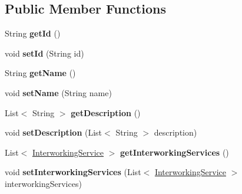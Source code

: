 \subsection*{Public Member Functions}
\begin{DoxyCompactItemize}
\item 
\mbox{\label{classeu_1_1h2020_1_1symbiote_1_1model_1_1mim_1_1System_a41604a076f13248f857928eaf1feb948}} 
String {\bfseries get\+Id} ()
\item 
\mbox{\label{classeu_1_1h2020_1_1symbiote_1_1model_1_1mim_1_1System_a82db0ed79ee0bf4d0c132a45501cba58}} 
void {\bfseries set\+Id} (String id)
\item 
\mbox{\label{classeu_1_1h2020_1_1symbiote_1_1model_1_1mim_1_1System_af329b8f6ab14475264da13b3db84d63b}} 
String {\bfseries get\+Name} ()
\item 
\mbox{\label{classeu_1_1h2020_1_1symbiote_1_1model_1_1mim_1_1System_a34d9e62c549cba8fe729e6bc5affa2be}} 
void {\bfseries set\+Name} (String name)
\item 
\mbox{\label{classeu_1_1h2020_1_1symbiote_1_1model_1_1mim_1_1System_ad850e47433742f9f32686a0e4a1c1f04}} 
List$<$ String $>$ {\bfseries get\+Description} ()
\item 
\mbox{\label{classeu_1_1h2020_1_1symbiote_1_1model_1_1mim_1_1System_a1ff459510245a46463781dd00783ecc8}} 
void {\bfseries set\+Description} (List$<$ String $>$ description)
\item 
\mbox{\label{classeu_1_1h2020_1_1symbiote_1_1model_1_1mim_1_1System_ac47a6f5dd4ca70d4bfca704fcc8c9bb4}} 
List$<$ \hyperlink{classeu_1_1h2020_1_1symbiote_1_1model_1_1mim_1_1InterworkingService}{Interworking\+Service} $>$ {\bfseries get\+Interworking\+Services} ()
\item 
\mbox{\label{classeu_1_1h2020_1_1symbiote_1_1model_1_1mim_1_1System_a8fcbc4ad6cb3b31daee2b9146eca17c8}} 
void {\bfseries set\+Interworking\+Services} (List$<$ \hyperlink{classeu_1_1h2020_1_1symbiote_1_1model_1_1mim_1_1InterworkingService}{Interworking\+Service} $>$ interworking\+Services)
\end{DoxyCompactItemize}


